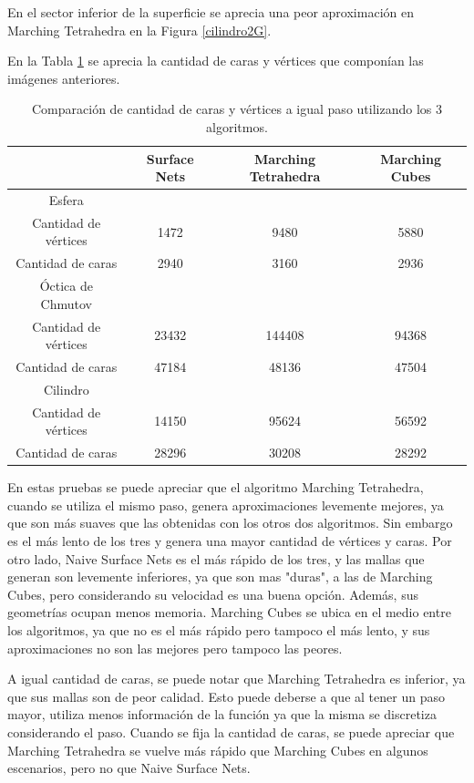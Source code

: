 \documentclass[12pt]{article}
\begin{document}
En el sector inferior de la superficie se aprecia una peor aproximación en Marching Tetrahedra en la Figura \ref{cilindro2G}.

En la Tabla \ref{cii} se aprecia la cantidad de caras y vértices que componían las imágenes anteriores.

\begin{table}[h!]
  \centering
  \begin{tabular}{cccc}
    \toprule
    & Surface Nets & Marching Tetrahedra & Marching Cubes\\
    \midrule
    Esfera&&&\\
    Cantidad de vértices & 1472 & 9480  & 5880 \\
    Cantidad de caras &  2940 & 3160 & 2936 \\
\hline
     Óctica de Chmutov&&&\\
    Cantidad de vértices & 23432 & 144408  & 94368 \\
    Cantidad de caras &  47184 & 48136 & 47504 \\
\hline
     Cilindro&&&\\
    Cantidad de vértices & 14150 &  95624 & 56592 \\
    Cantidad de caras &  28296 & 30208 & 28292 \\
\bottomrule
  \end{tabular}
  \caption{Comparación de cantidad de caras y vértices a igual paso utilizando los 3 algoritmos.}
  \label{cii}
\end{table}

En estas pruebas se puede apreciar que el algoritmo Marching Tetrahedra, cuando se utiliza el mismo paso, genera aproximaciones levemente mejores, ya que son más suaves que las obtenidas con los otros dos algoritmos. Sin embargo es el más lento de los tres y genera una mayor cantidad de vértices y caras. Por otro lado, Naive Surface Nets es el más rápido de los tres, y las mallas que generan son levemente inferiores, ya que son mas "duras", a las de Marching Cubes, pero considerando su velocidad es una buena opción. Además, sus geometrías ocupan menos memoria. Marching Cubes se ubica en el medio entre los algoritmos, ya que no es el más rápido pero tampoco el más lento, y sus aproximaciones no son las mejores pero tampoco las peores.

A igual cantidad de caras, se puede notar que Marching Tetrahedra es inferior, ya que sus mallas son de peor calidad. Esto puede deberse a que al tener un paso mayor, utiliza menos información de la función ya que la misma se discretiza considerando el paso. Cuando se fija la cantidad de caras, se puede apreciar que Marching Tetrahedra se vuelve más rápido que Marching Cubes en algunos escenarios, pero no que Naive Surface Nets.
\end{document}
